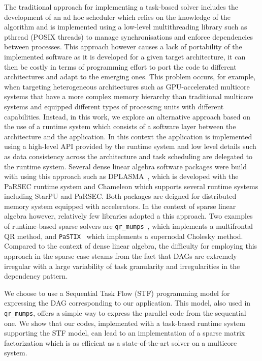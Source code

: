 \documentclass{article}
\newcommand{\starpu}{{StarPU}\xspace}
\newcommand{\parsec}{{PaRSEC}\xspace}
\newcommand{\qrm}{\texttt{qr\_mumps}\xspace}
\newcommand{\pastix}{\texttt{PaSTIX}\xspace}
\begin{document}
The traditional approach for implementing a task-based solver includes
the development of an ad hoc scheduler which relies on the knowledge
of the algorithm and is implemented using a low-level multithreading
library such as pthread (POSIX threads) to manage synchronisations and
enforce dependencies between processes. This approach however causes a
lack of portability of the implemented software as it is developed for
a given target architecture, it can then be costly in terms of
programming effort to port the code to different architectures and
adapt to the emerging ones. This problem occurs, for example, when
targeting heterogeneous architectures such as GPU-accelerated
multicore systems that have a more complex memory hierarchy than
traditional multicore systems and equipped different types of
processing units with different capabilities. Instead, in this work,
we explore an alternative approach based on the use of a runtime
system which consists of a software layer between the architecture and
the application. In this context the application is implemented using
a high-level API provided by the runtime system and low level details
such as data consistency across the architecture and task scheduling
are delegated to the runtime system. Several dense linear algebra
software packages were build with using this approach such as
DPLASMA~\cite{b.b.d.f.ea:11}, which is developed with the \parsec
runtime system and Chameleon which supports several runtime systems
including \starpu and \parsec. Both packages are deigned for
distributed memory system equipped with accelerators. In the context
of sparse linear algebra however, relatively few libraries adopted a
this approach. Two examples of runtime-based sparse solvers are
\qrm~\cite{a.b.g.l.:14}, which implements a multifrontal QR method,
and \pastix~\cite{h.r.r:02} which implements a supernodal Cholesky
method. Compared to the context of dense linear algebra, the
difficulty for employing this approach in the sparse case steams from
the fact that DAGs are extremely irregular with a large variability of
task granularity and irregularities in the dependency pattern.

We choose to use a Sequential Task Flow (STF) programming model for
expressing the DAG corresponding to our application. This model, also
used in \qrm, offers a simple way to express the parallel code from
the sequential one. We show that our codes, implemented with a
task-based runtime system supporting the STF model, can lead to an
implementation of a sparse matrix factorization which is as efficient
as a state-of-the-art solver on a multicore system.
\end{document}
